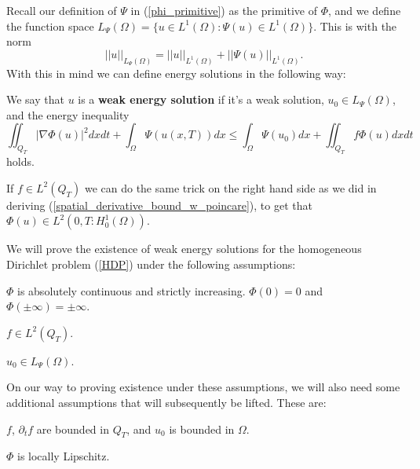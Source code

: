 \documentclass[11pt, a4paper]{article}
\begin{document}
Recall our definition of $\Psi$ in (\ref{phi_primitive}) as the primitive of $\Phi$,
and we define the function space $L_\Psi(\Omega) = \{ u\in L^1(\Omega): \Psi(u)\in L^1(\Omega)\}$. This is with the norm
\begin{equation}
||u||_{L_\Psi (\Omega)} = ||u||_{L^1(\Omega)} + ||\Psi(u)||_{L^1(\Omega)}.
\end{equation}
With this in mind we can define energy solutions in the following way:
\begin{mydef}
We say that $u$ is a \textbf{weak energy solution} if it's a weak solution, $u_0 \in L_\Psi(\Omega)$, and the energy inequality
\begin{equation}
\label{energy_ineq}
\iint_{Q_T} |\nabla \Phi(u)|^2 dxdt + \int_\Omega \Psi(u(x,T))dx \leq \int_\Omega \Psi(u_0)dx + \iint_{Q_T}f\Phi(u)dxdt
\end{equation}
holds.
\end{mydef}
\setcounter{obs}{0}
\begin{obs}
If $f\in L^2(Q_T)$ we can do the same trick on the right hand side as we did in deriving (\ref{spatial_derivative_bound_w_poincare}), to get that $\Phi(u) \in L^2(0,T: H^1_0(\Omega))$.
\end{obs}

We will prove the existence of weak energy solutions for the homogeneous Dirichlet problem (\ref{HDP}) under the following assumptions:
\begin{assumption}
\label{ass:Phi_general}
$\Phi$ is absolutely continuous and strictly increasing. $\Phi(0) = 0$ and $\Phi(\pm \infty) = \pm \infty$.
\end{assumption}

\begin{assumption}
\label{ass:f}
$f \in L^2(Q_T)$.
\end{assumption}

\begin{assumption}
\label{ass:u_0}
$u_0 \in L_{\Psi}(\Omega)$.
\end{assumption}

On our way to proving existence under these assumptions, we will also need some additional assumptions that will subsequently be lifted. These are:
\begin{assumption}
\label{ass:f_ft_u_0_bounded}
$f$, $\partial_t f$ are bounded in $Q_T$, and $u_0$ is bounded in $\Omega$.
\end{assumption}

\begin{assumption}
\label{ass:Phi_lipschitz}
$\Phi$ is locally Lipschitz.
\end{assumption}
\end{document}
